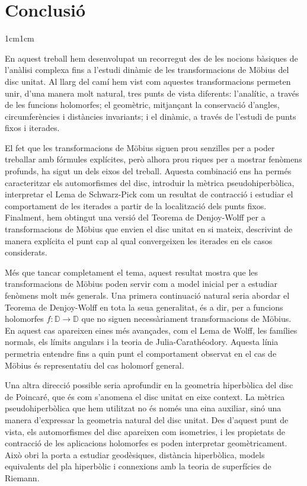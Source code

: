 \section{Conclusió}

\begin{adjustwidth}{1cm}{1cm}

En aquest treball hem desenvolupat un recorregut des de les nocions bàsiques de l'anàlisi complexa fins a l'estudi dinàmic de les transformacions de Möbius del disc unitat. Al llarg del camí hem vist com aquestes transformacions permeten unir, d'una manera molt natural, tres punts de vista diferents: l'analític, a través de les funcions holomorfes; el geomètric, mitjançant la conservació d'angles, circumferències i distàncies invariants; i el dinàmic, a través de l'estudi de punts fixos i iterades.

El fet que les transformacions de Möbius siguen prou senzilles per a poder treballar amb fórmules explícites, però alhora prou riques per a mostrar fenòmens profunds, ha sigut un dels eixos del treball. Aquesta combinació ens ha permés caracteritzar els automorfismes del disc, introduir la mètrica pseudohiperbòlica, interpretar el Lema de Schwarz-Pick com un resultat de contracció i estudiar el comportament de les iterades a partir de la localització dels punts fixos. Finalment, hem obtingut una versió del Teorema de Denjoy-Wolff per a transformacions de Möbius que envien el disc unitat en si mateix, descrivint de manera explícita el punt cap al qual convergeixen les iterades en els casos considerats.

Més que tancar completament el tema, aquest resultat mostra que les transformacions de Möbius poden servir com a model inicial per a estudiar fenòmens molt més generals. Una primera continuació natural seria abordar el Teorema de Denjoy-Wolff en tota la seua generalitat, és a dir, per a funcions holomorfes $f : \mathbb{D} \to \mathbb{D}$ que no siguen necessàriament transformacions de Möbius. En aquest cas apareixen eines més avançades, com el Lema de Wolff, les famílies normals, els límits angulars i la teoria de Julia-Carathéodory. Aquesta línia permetria entendre fins a quin punt el comportament observat en el cas de Möbius és representatiu del cas holomorf general.

Una altra direcció possible seria aprofundir en la geometria hiperbòlica del disc de Poincaré, que és com s'anomena el disc unitat en eixe context. La mètrica pseudohiperbòlica que hem utilitzat no és només una eina auxiliar, sinó una manera d'expressar la geometria natural del disc unitat. Des d'aquest punt de vista, els automorfismes del disc apareixen com isometries, i les propietats de contracció de les aplicacions holomorfes es poden interpretar geomètricament. Això obri la porta a estudiar geodèsiques, distància hiperbòlica, models equivalents del pla hiperbòlic i connexions amb la teoria de superfícies de Riemann.


\end{adjustwidth}
